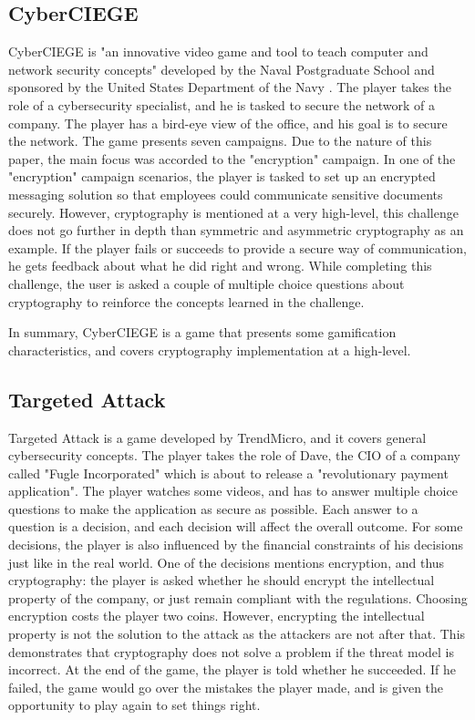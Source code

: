 \documentclass{l4proj}
\begin{document}
\subsection{CyberCIEGE}

CyberCIEGE is "an innovative video game and tool to teach computer and network security concepts" developed by the Naval Postgraduate School and 
sponsored by the United States Department of the Navy \citep{noauthor_cyberciege_nodate}. The player takes the role of a cybersecurity specialist, 
and he is tasked to secure the network of a company. The player has a bird-eye view of the office, and his goal is to secure the network.
The game presents seven campaigns. Due to the nature of this paper, the main focus was accorded to the "encryption" campaign.
In one of the "encryption" campaign scenarios, the player is tasked to set up an encrypted messaging solution so that employees could communicate sensitive documents securely.
However, cryptography is mentioned at a very high-level, this challenge does not go further in depth than symmetric and asymmetric cryptography as an example.
If the player fails or succeeds to provide a secure way of communication, he gets feedback about what he did right and wrong.
While completing this challenge, the user is asked a couple of multiple choice questions about cryptography to reinforce the concepts learned in the challenge.

In summary, CyberCIEGE is a game that presents some gamification characteristics, and covers cryptography implementation at a high-level.

\subsection{Targeted Attack}

Targeted Attack is a game developed by TrendMicro, and it covers general cybersecurity concepts.
The player takes the role of Dave, the CIO of a company called "Fugle Incorporated" which is about to release a "revolutionary payment application".
The player watches some videos, and has to answer multiple choice questions to make the application as secure as possible. 
Each answer to a question is a decision, and each decision will affect the overall outcome. 
For some decisions, the player is also influenced by the financial constraints of his decisions just like in the real world.
One of the decisions mentions encryption, and thus cryptography: the player is asked whether he should encrypt the intellectual property of the company, 
or just remain compliant with the regulations. Choosing encryption costs the player two coins. 
However, encrypting the intellectual property is not the solution to the attack as the attackers are not after that.
This demonstrates that cryptography does not solve a problem if the threat model is incorrect.
At the end of the game, the player is told whether he succeeded. If he failed, the game would go over the mistakes the player made, 
and is given the opportunity to play again to set things right.
\end{document}
